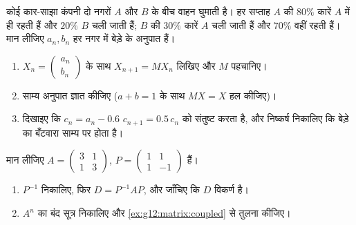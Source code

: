 \begin{exercise}[$\star\star$]\label{exo:g12:matrix:7}
कोई कार-साझा कंपनी दो नगरों $A$ और $B$ के बीच वाहन घुमाती है। हर सप्ताह
$A$ की $80\%$ कारें $A$ में ही रहती हैं और $20\%$ $B$ चली जाती हैं; $B$
की $30\%$ कारें $A$ चली जाती हैं और $70\%$ वहीं रहती हैं। मान लीजिए $a_n, b_n$ हर
नगर में बेड़े के अनुपात हैं।
\begin{omfigure}
\end{omfigure}
\begin{enumerate}
  \item $X_n = \begin{pmatrix} a_n\\ b_n\end{pmatrix}$ के साथ $X_{n+1} = MX_n$ लिखिए और $M$ पहचानिए।
  \item साम्य अनुपात ज्ञात कीजिए ($a + b = 1$ के साथ $MX = X$ हल कीजिए)।
  \item दिखाइए कि $c_n = a_n - 0.6$ $c_{n+1} = 0.5\,c_n$ को संतुष्ट करता है, और निष्कर्ष निकालिए कि
        बेड़े का बँटवारा साम्य पर  होता है।
\end{enumerate}
\end{exercise}

\begin{exercise}[$\star\star\star$]\label{exo:g12:matrix:8}
मान लीजिए $A = \begin{pmatrix} 3 & 1\\ 1 & 3 \end{pmatrix}$, $P = \begin{pmatrix} 1 & 1\\ 1 & -1 \end{pmatrix}$ हैं।
\begin{enumerate}
  \item $P^{-1}$ निकालिए, फिर $D = P^{-1}AP$, और जाँचिए कि $D$ विकर्ण है।
  \item $A^n$ का बंद सूत्र निकालिए और \cref{ex:g12:matrix:coupled} से तुलना कीजिए।
\end{enumerate}
\end{exercise}


